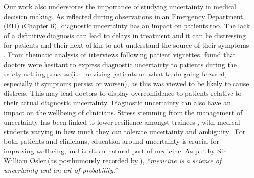 \documentclass[a4paper, nobind]{templates/ociamthesis}
\begin{document}
Our work also underscores the importance of studying uncertainty in medical decision making. As reflected during observations in an Emergency Department (ED) (Chapter 6), diagnostic uncertainty has an impact on patients too. The lack of a definitive diagnosis can lead to delays in treatment and it can be distressing for patients and their next of kin to not understand the source of their symptoms \autocite{dahm2023}. From thematic analysis of interviews following patient vignettes, \textcite{cox_role_2024} found that doctors were hesitant to express diagnostic uncertainty to patients during the safety netting process (i.e.~advising patients on what to do going forward, especially if symptoms persist or worsen), as this was viewed to be likely to cause distress. This may lead doctors to display overconfidence to patients relative to their actual diagnostic uncertainty. Diagnostic uncertainty can also have an impact on the wellbeing of clinicians. Stress stemming from the management of uncertainty has been linked to lower resilience amongst trainees \autocite{simpkin_stress_2018}, with medical students varying in how much they can tolerate uncertainty and ambiguity \autocite{hancock_tolerance_2020}. For both patients and clinicians, education around uncertainty is crucial for improving wellbeing, and is also a natural part of medicine. As put by Sir William Osler (as posthumously recorded by \textcite{bean1954}), \emph{``medicine is a science of uncertainty and an art of probability.''}\\
\end{document}
